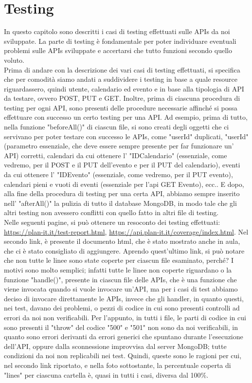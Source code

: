 \section{Testing}
\label{secD4:Testing}

In questo capitolo sono descritti i casi di testing effettuati sulle APIs da noi sviluppate. La parte di testing è fondamentale per poter individuare eventuali problemi sulle APIs sviluppate e accertarsi che tutto funzioni secondo quello voluto.\\
Prima di andare con la descrizione dei vari casi di testing effettuati, si specifica che per comodità siamo andati a suddividere i testing in base a quale resource riguardassero, quindi utente, calendario ed evento e in base alla tipologia di API da testare, ovvero POST, PUT e GET. Inoltre, prima di ciascuna procedura di testing per ogni API, sono presenti delle procedure necessarie affinché si possa effettuare con successo un certo testing per una API. Ad esempio, prima di tutto, nella funzione "beforeAll()" di ciascun file, si sono creati degli oggetti che ci servivano per poter testare con successo le APIs, come "userId" duplicati, "userId" (parametro essenziale, che deve essere sempre presente per far funzionare un' API) corretti, calendari da cui ottenere l' "IDCalendario" (essenziale, come vedremo, per il POST e il PUT dell'evento e per il PUT del calendario), eventi da cui ottenere l' "IDEvento" (essenziale, come vedremo, per il PUT evento), calendari pieni e vuoti di eventi (essenziale per l'api GET Evento), ecc.. E dopo, alla fine della procedura di testing per una certa API, abbiamo sempre inserito nell' "afterAll()" la pulizia di tutto il database MongoDB, in modo tale che gli altri testing non avessero conflitti con quello fatto in altri file di testing. \\ Nelle seguenti pagine, si può ottenere un resoconto dei testing effettuati: \href{https://plan-it.it/test-report.html} {https://plan-it.it/test-report.html}, \href{https://api.plan-it.it/coverage/index.html} {https://api.plan-it.it/coverage/index.html}. Nel secondo link, è presente il documento html, che è stato mostrato anche in aula, che ci è stato consigliato di aggiungere. Aprendo quest'ultimo link, si può notare che non tutte le linee sono state coperte per ciascun file esaminato, perché? I motivi sono molto semplici; infatti tutte le linee non coperte riguardano o la funzione "handle()", presente in ciascun file delle APIs, che è una funzione che viene invocata quando si vuole invocare un'API, ma per i casi di test abbiamo deciso di invocare direttamente le APIs, invece che gli handler, in quanto questi, nei test, davano dei problemi, o pezzi di codice in cui sono presenti controlli ad errori da noi non verificabili. Per l'appunto, in tutti i file, le parti di codice in cui sono presenti il "throw" del codice "500" e "501" non sono da noi verificabili, in quanto sono errori derivanti da errori generici che spuntano durante l'esecuzione dell'API, oppure dalla sconnessione improvvisa dal server MongoDB; tutte condizioni da noi non replicabili nei test. Quindi, queste sono le ragioni per cui, nel secondo link riportato, e nella foto sottostante, la percentuale coperta di "lines" per ciascuna cartella è, quasi in tutti i casi, diversa dal 100\%.

